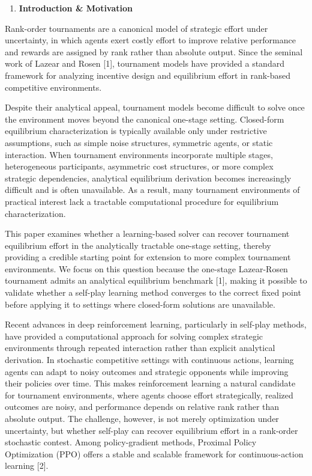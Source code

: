 \documentclass[
]{article}
\begin{document}
\begin{enumerate}
\def\labelenumi{\arabic{enumi}.}
\item
  \textbf{Introduction \& Motivation}
\end{enumerate}

Rank-order tournaments are a canonical model of strategic effort under
uncertainty, in which agents exert costly effort to improve relative
performance and rewards are assigned by rank rather than absolute
output. Since the seminal work of Lazear and Rosen {[}1{]}, tournament
models have provided a standard framework for analyzing incentive design
and equilibrium effort in rank-based competitive environments.

Despite their analytical appeal, tournament models become difficult to
solve once the environment moves beyond the canonical one-stage setting.
Closed-form equilibrium characterization is typically available only
under restrictive assumptions, such as simple noise structures,
symmetric agents, or static interaction. When tournament environments
incorporate multiple stages, heterogeneous participants, asymmetric cost
structures, or more complex strategic dependencies, analytical
equilibrium derivation becomes increasingly difficult and is often
unavailable. As a result, many tournament environments of practical
interest lack a tractable computational procedure for equilibrium
characterization.

This paper examines whether a learning-based solver can recover
tournament equilibrium effort in the analytically tractable one-stage
setting, thereby providing a credible starting point for extension to
more complex tournament environments. We focus on this question because
the one-stage Lazear-Rosen tournament admits an analytical equilibrium
benchmark {[}1{]}, making it possible to validate whether a self-play
learning method converges to the correct fixed point before applying it
to settings where closed-form solutions are unavailable.

Recent advances in deep reinforcement learning, particularly in
self-play methods, have provided a computational approach for solving
complex strategic environments through repeated interaction rather than
explicit analytical derivation. In stochastic competitive settings with
continuous actions, learning agents can adapt to noisy outcomes and
strategic opponents while improving their policies over time. This makes
reinforcement learning a natural candidate for tournament environments,
where agents choose effort strategically, realized outcomes are noisy,
and performance depends on relative rank rather than absolute output.
The challenge, however, is not merely optimization under uncertainty,
but whether self-play can recover equilibrium effort in a rank-order
stochastic contest. Among policy-gradient methods, Proximal Policy
Optimization (PPO) offers a stable and scalable framework for
continuous-action learning {[}2{]}.
\end{document}
